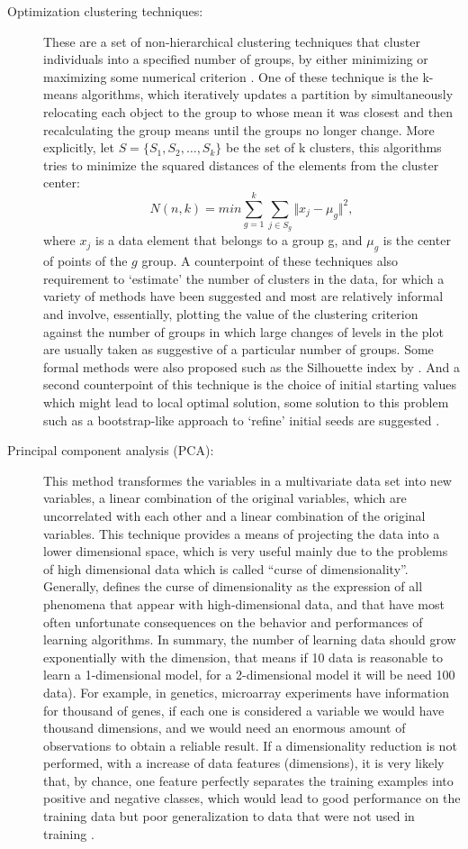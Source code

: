 \begin{description}
\item[Optimization clustering
techniques:]{
These are a set of non-hierarchical clustering techniques that cluster individuals into a specified number of groups, by either minimizing or maximizing some numerical criterion \cite{everitt2011hierarchical}.  One of these technique is the k-means algorithms, which iteratively updates a partition by simultaneously relocating each object to the group to whose mean it was closest and then recalculating the group means until the groups no longer change.
More explicitly, let $S = \{S_1,S_2,\ldots,S_k\}$  be the set of k clusters, this algorithms tries to minimize the squared distances of the elements from the cluster center:
$$ N(n,k) = min\sum_{g = 1}^{k}\sum_{j \in S_g}\Vert x_j - \mu_g\Vert^2,$$
where $x_j$ is a data element that belongs to a group g, and $\mu_g$ is the center of points of the $g$ group. A counterpoint of these techniques also requirement to ‘estimate’ the number of clusters in the data, for which a variety of methods
have been suggested and  most are
relatively informal and involve, essentially, plotting the value of the clustering
criterion against the number of groups in which large changes of levels in the plot are
usually taken as suggestive of a particular number of groups.
Some formal methods were also proposed such as the Silhouette index by .
And a second counterpoint of this technique is the choice of initial starting values which might lead to local optimal solution, some solution to this problem such as a  bootstrap-like approach to ‘refine’ initial seeds are suggested \cite{steinley2003local}.
}
\item[Principal component analysis (PCA):]{
This method transformes the variables in a multivariate data set into new variables, a linear combination of the original variables, which are uncorrelated with each other and a linear combination of the original variables. This technique provides a means of
projecting the data into a lower dimensional space, which is very useful  mainly due to the problems of high dimensional data which is called ``curse of dimensionality''.
Generally,  defines the curse of dimensionality as the expression of all phenomena that appear with high-dimensional data, and that have most often unfortunate consequences on the behavior and performances of learning algorithms. In summary, the number of learning data should grow exponentially with
the dimension, that means if 10 data  is reasonable to learn a 1-dimensional model, for a 2-dimensional model it will be need 100 data). For example, in genetics, microarray experiments have information for thousand of genes, if each one is considered a variable we would have thousand dimensions,
and we would need an enormous amount of observations to obtain a reliable result. If a dimensionality reduction is not performed, with a increase of data features (dimensions), it is very likely that, by chance, one feature perfectly separates the training examples into positive and negative classes, which would lead
to good performance on the training data but poor generalization to data that were not used in training \cite{libbrecht2015machine}.
}
\end{description}

